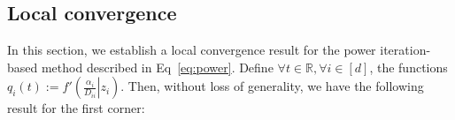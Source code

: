 \documentclass[letterpaper]{article}
\newcommand{\bas}[1]{\begin{align*}#1\end{align*}}
\newcommand{\bu}{\pmb{u}}
\newcommand{\balpha}{\pmb{\alpha}}
\newcommand{\be}{\pmb{e}}
\newcommand{\rd}{\color{red}}
\newcommand{\bk}{\color{black}}
\newcommand{\bb}[1]{\left(#1\right)}
\begin{document}
\subsection{Local convergence}
In this section, we establish a local convergence result for the power iteration-based method described in Eq~\ref{eq:power}. Define $\forall t \in \mathbb{R}, \forall i \in [d]$, the functions $q_{i}\bb{t} := f'\bb{\left.\frac{\alpha_i}{D_{ii}}\right|z_i}$.
Then, without loss of generality, we have the following result for the first corner:
\end{document}
